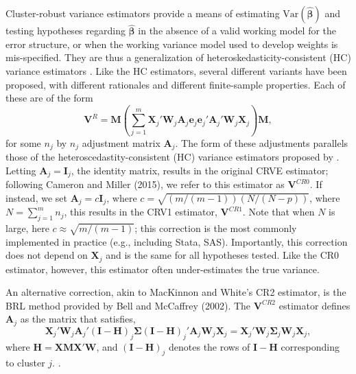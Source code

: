 \documentclass[12pt]{article}\usepackage[]{graphicx}\usepackage[]{color}
\newcommand{\Var}{\text{Var}}
\newcommand{\bm}{\mathbf}
\newcommand{\bs}{\boldsymbol}
\begin{document}
Cluster-robust variance estimators provide a means of estimating $\Var\left(\bs{\hat\beta}\right)$ and testing hypotheses regarding $\hat{\bs\beta}$ in the absence of a valid working model for the error structure, or when the working variance model used to develop weights is mis-specified. 
They are thus a generalization of heteroskedasticity-consistent (HC) variance estimators \citep{MacKinnon1985some}. 
Like the HC estimators, several different variants have been proposed, with different rationales and different finite-sample properties. Each of these are of the form
\begin{equation}
\label{eq:V_small}
\bm{V}^{R} = \bm{M}\left(\sum_{j=1}^m \bm{X}_j'\bm{W}_j \bm{A}_j \bm{e}_j \bm{e}_j' \bm{A}_j' \bm{W}_j \bm{X}_j\right) \bm{M},
\end{equation}
for some $n_j$ by $n_j$ adjustment matrix $\bm{A}_j$. The form of these adjustments parallels those of the heteroscedastity-consistent (HC) variance estimators proposed by \citet{MacKinnon1985some}. Letting $\bm{A}_j = \bm{I}_j$, the identity matrix, results in the original CRVE estimator; following Cameron and Miller (2015), we refer to this estimator as $\bm{V}^{CR0}$. If instead, we set $\bm{A}_j = c\bm{I}_j$, where $c = \sqrt{(m/(m-1))(N/(N - p))}$, where $N = \sum_{j=1}^m n_j$, this results in the CRV1 estimator, $\bm{V}^{CR1}$. Note that when $N$ is large, here $c \approx \sqrt{m/(m-1)}$; this correction is the most commonly implemented in practice (e.g., including Stata, SAS). Importantly, this correction does not depend on $\bm{X}_j$ and is the same for all hypotheses tested. Like the CR0 estimator, however, this estimator often under-estimates the true variance.

An alternative correction, akin to MacKinnon and White's CR2 estimator, is the BRL method provided by Bell and McCaffrey (2002). The $\bm{V}^{CR2}$ estimator defines $\bm{A}_j$ as the matrix that satisfies,
\begin{equation}
\label{eq:CR2_criterion}
\bm{X}_j' \bm{W}_j \bm{A}_j' \left(\bm{I} - \bm{H}\right)_j \bs{\Sigma} \left(\bm{I} - \bm{H}\right)_j' \bm{A}_j \bm{W}_j \bm{X}_j = \bm{X}_j' \bm{W}_j \bs{\Sigma}_j \bm{W}_j \bm{X}_j,
\end{equation}
where $\bm{H} = \bm{X}\bm{M}\bm{X}'\bm{W}$, and $\left(\bm{I} - \bm{H}\right)_j$ denotes the rows of $\bm{I} - \bm{H}$ corresponding to cluster $j$. . 
\end{document}
